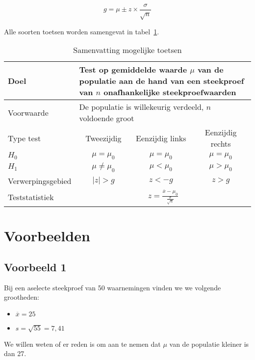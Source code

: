 \begin{equation}
  g = \mu \pm z \times \frac{\sigma}{\sqrt{n}}
  \label{eq:kritiekeGrenswaarde}
\end{equation}

Alle soorten toetsen worden samengevat in tabel~\ref{tab:toetsingsprocedures}.

\begin{table}
  \centering
  \begin{tabular}{l|ccc}
    \toprule
    Doel              & \multicolumn{3}{l}{\parbox{.5\textwidth}{Test op gemiddelde waarde $\mu$ van de populatie aan de hand van een steekproef van $n$ onafhankelijke steekproefwaarden}} \\
    \midrule
    Voorwaarde        & \multicolumn{3}{l}{\parbox{.5\textwidth}{De populatie is willekeurig verdeeld, $n$ voldoende groot}} \\
    \midrule
    Type test         & Tweezijdig           & Eenzijdig links & Eenzijdig rechts \\
    \midrule
    $H_{0}$           & $\mu = \mu_{0}$      & $\mu = \mu_{0}$ & $\mu = \mu_{0}$  \\
    $H_{1}$           & $\mu \neq \mu_{0}$   & $\mu < \mu_{0}$ & $\mu > \mu_{0}$  \\
    Verwerpingsgebied & $\left|z\right| > g$ & $z< -g $        & $z>g$            \\
    Teststatistiek    & \multicolumn{3}{c}{$z = \frac{\overline{x} - \mu_{0}}{\frac{\sigma}{\sqrt{n}}}$} \\
    \bottomrule
  \end{tabular}
  \caption{Samenvatting mogelijke toetsen}
  \label{tab:toetsingsprocedures}
\end{table}

\section{Voorbeelden}
\subsection{Voorbeeld 1}
Bij een aselecte steekproef van 50 waarnemingen vinden we we volgende grootheden:
\begin{itemize}
  \item $\overline{x} = 25$
  \item $s = \sqrt{55} = 7,41$
\end{itemize}

We willen weten of er reden is om aan te nemen dat $\mu$ van de populatie kleiner is dan 27.


